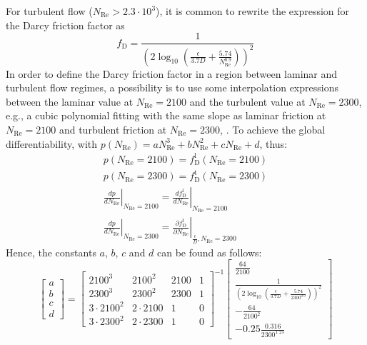 \documentclass[%
]{USN-PhD}
\begin{document}
For turbulent flow ($N_\mathrm{Re} > 2.3\cdot10^3$), it is common to rewrite the expression for the Darcy friction factor as
\begin{equation}\label{eq:eq3}
f_\mathrm{D}=\frac{1}{\left(2\log_{10} \left(\frac{\epsilon}{3.7D} + \frac{5.74}{N_\mathrm{Re}^{0.9}}\right)\right)^ 2}
\end{equation}
In order to define the Darcy friction factor in a region between laminar and turbulent flow regimes, a possibility is to use some interpolation expressions between the laminar value at $N_\mathrm{Re}=2100$ and the turbulent value at $N_\mathrm{Re}= 2300$, e.g., a cubic polynomial fitting with the same slope as laminar friction at $N_\mathrm{Re}=2100$ and turbulent friction at $N_\mathrm{Re}=2300$, \cite{LieL:18}. To achieve the global differentiability, with $p(N_\mathrm{Re})=aN_\mathrm{Re}^3+bN_\mathrm{Re}^2+cN_\mathrm{Re}+d$, thus:
\begin{equation}
\begin{array}{c}
p(N_\mathrm{Re}=2100)=f_\mathrm{D}^\mathrm{l}(N_\mathrm{Re}=2100)\\
p(N_\mathrm{Re}=2300)=f_\mathrm{D}^\mathrm{t}(N_\mathrm{Re}=2300)\\
\left.\frac{dp}{dN_\mathrm{Re}}\right\rvert_{N_\mathrm{Re}=2100}=\left.\frac{df_\mathrm{D}^\mathrm{l}}{dN_\mathrm{Re}}\right\rvert_{N_\mathrm{Re}=2100}\\
\left.\frac{dp}{dN_\mathrm{Re}}\right\rvert_{N_\mathrm{Re}=2300}=\left.\frac{\partial f_\mathrm{D}^\mathrm{t}}{\partial N_\mathrm{Re}}\right\rvert_{\frac{\epsilon}{D},N_\mathrm{Re}=2300}
\end{array}
\end{equation}
Hence, the constants $a$, $b$, $c$ and $d$ can be found as follows:
\begin{equation}\label{eq:eq4}
\begin{bmatrix}a\\b\\c\\d \end{bmatrix}=
\begin{bmatrix}2100^3&2100^2 & 2100& 1\\ 2300^3 & 2300^2 & 2300 & 1\\ 3\cdot2100^2 & 2\cdot2100& 1 & 0\\ 3\cdot2300^2 & 2\cdot2300 &1 & 0\end{bmatrix}^{-1}
\begin{bmatrix} \frac{64}{2100} \\ \frac{1}{\left(2\log_{10}\left(\frac{\epsilon}{3.7D}+\frac{5.74}{2300^ {0.9}}\right)\right)^2} \\ -\frac{64}{2100^ 2} \\ -0.25\frac{0.316}{2300^{1.25}} \end{bmatrix}
\end{equation}
\end{document}
